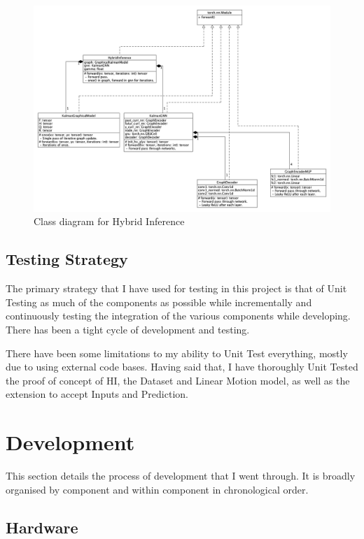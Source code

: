 \documentclass[]{../resources/final_report}
\begin{document}
\begin{figure}[h!]
  \centering
  \includegraphics[height=0.36\textheight]{hybrid-inference-uml.png}
  \caption{Class diagram for Hybrid Inference}
  \label{}
\end{figure}

\subsection{Testing Strategy}



The primary strategy that I have used for testing in this project is that of Unit Testing as much
of the components as possible while incrementally and continuously testing the integration of the
various components while developing. There has been a tight cycle of development and testing.

There have been some limitations to my ability to Unit Test everything, mostly due to using external
code bases. Having said that, I have thoroughly Unit Tested the proof of concept of HI, the Dataset
and Linear Motion model, as well as the extension to accept Inputs and Prediction.

\section{Development}

This section details the process of development that I went through. It is broadly organised by 
component and within component in chronological order.

\subsection{Hardware}
\end{document}
